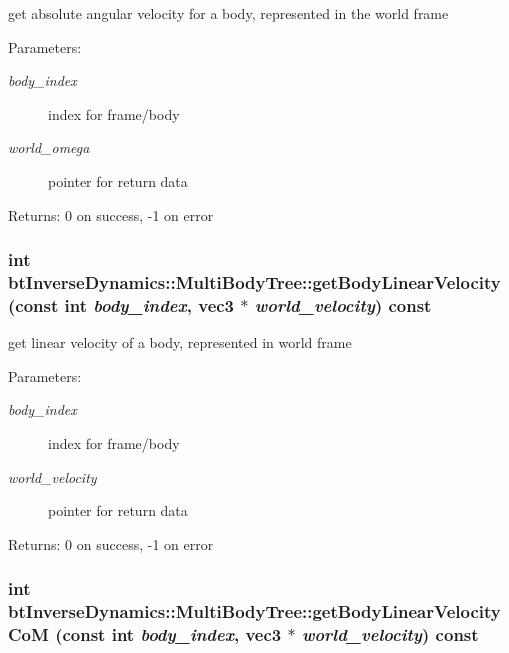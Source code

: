get absolute angular velocity for a body, represented in the world frame \begin{Desc}
\item[Parameters:]
\begin{description}
\item[{\em body\_\-index}]index for frame/body \item[{\em world\_\-omega}]pointer for return data \end{description}
\end{Desc}
\begin{Desc}
\item[Returns:]0 on success, -1 on error \end{Desc}
\hypertarget{classbt_inverse_dynamics_1_1_multi_body_tree_c8076ba03722eb2744d1cccd09bfeb41}{
\subsubsection[getBodyLinearVelocity]{\setlength{\rightskip}{0pt plus 5cm}int btInverseDynamics::MultiBodyTree::getBodyLinearVelocity (const int {\em body\_\-index}, \/  {\bf vec3} $\ast$ {\em world\_\-velocity}) const}}
\label{classbt_inverse_dynamics_1_1_multi_body_tree_c8076ba03722eb2744d1cccd09bfeb41}


get linear velocity of a body, represented in world frame \begin{Desc}
\item[Parameters:]
\begin{description}
\item[{\em body\_\-index}]index for frame/body \item[{\em world\_\-velocity}]pointer for return data \end{description}
\end{Desc}
\begin{Desc}
\item[Returns:]0 on success, -1 on error \end{Desc}
\hypertarget{classbt_inverse_dynamics_1_1_multi_body_tree_0e3e87b9f2531a8771fa7193449ca26d}{
\subsubsection[getBodyLinearVelocityCoM]{\setlength{\rightskip}{0pt plus 5cm}int btInverseDynamics::MultiBodyTree::getBodyLinearVelocityCoM (const int {\em body\_\-index}, \/  {\bf vec3} $\ast$ {\em world\_\-velocity}) const}}
\label{classbt_inverse_dynamics_1_1_multi_body_tree_0e3e87b9f2531a8771fa7193449ca26d}


